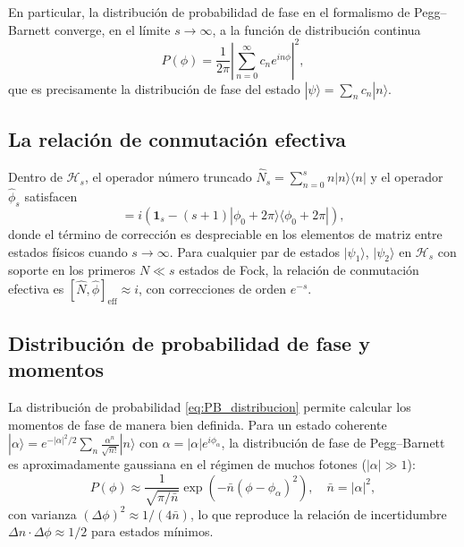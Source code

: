             En particular, la distribución de probabilidad de fase en el formalismo de Pegg--Barnett converge, en el límite $s \to \infty$, a la función de distribución continua
            \begin{equation}
                P(\phi) = \frac{1}{2\pi}\left|\sum_{n=0}^{\infty} c_n e^{in\phi}\right|^2,
                \label{eq:PB_distribucion}
            \end{equation}
            que es precisamente la distribución de fase del estado $|\psi\rangle = \sum_n c_n |n\rangle$.
 
        \subsection{La relación de conmutación efectiva}
        
            Dentro de $\mathcal{H}_s$, el operador número truncado $\hat{N}_s = \sum_{n=0}^{s} n|n\rangle\langle n|$ y el operador $\hat{\phi}_s$ satisfacen
            \begin{equation}
                [\hat{N}_s, \hat{\phi}_s] = i\left(\mathbf{1}_s - (s+1)|\phi_0 + 2\pi\rangle\langle\phi_0 + 2\pi|\right),
                \label{eq:PB_conmutador}
            \end{equation}
            donde el término de corrección es despreciable en los elementos de matriz entre estados físicos cuando $s \to \infty$. Para cualquier par de estados $|\psi_1\rangle$, $|\psi_2\rangle$ en $\mathcal{H}_s$ con soporte en los primeros $N \ll s$ estados de Fock, la relación de conmutación efectiva es $[\hat{N}, \hat{\phi}]_{\text{eff}} \approx i$, con correcciones de orden $e^{-s}$.
 
        \subsection{Distribución de probabilidad de fase y momentos}
        
            La distribución de probabilidad \eqref{eq:PB_distribucion} permite calcular los momentos de fase de manera bien definida. Para un estado coherente $|\alpha\rangle = e^{-|\alpha|^2/2}\sum_n \frac{\alpha^n}{\sqrt{n!}}|n\rangle$ con $\alpha = |\alpha|e^{i\phi_\alpha}$, la distribución de fase de Pegg--Barnett es aproximadamente gaussiana en el régimen de muchos fotones ($|\alpha| \gg 1$):
            \begin{equation}
                P(\phi) \approx \frac{1}{\sqrt{\pi/\bar{n}}} \exp\left(-\bar{n}(\phi - \phi_\alpha)^2\right), \quad \bar{n} = |\alpha|^2,
                \label{eq:PB_coherente}
            \end{equation}
            con varianza $(\Delta\phi)^2 \approx 1/(4\bar{n})$, lo que reproduce la relación de incertidumbre $\Delta n \cdot \Delta\phi \approx 1/2$ para estados mínimos.
            
